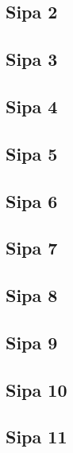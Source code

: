 \newpage

\subsection{Sipa 2}
\subsection{Sipa 3}
\subsection{Sipa 4}
\subsection{Sipa 5}
\subsection{Sipa 6}
\subsection{Sipa 7}
\subsection{Sipa 8}
\subsection{Sipa 9}
\subsection{Sipa 10}
\subsection{Sipa 11}

